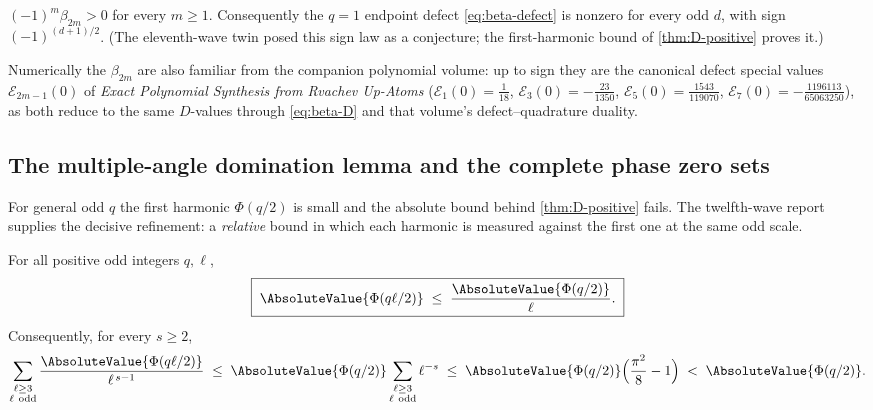 \documentclass[11pt,oneside]{article}
\numberwithin{equation}{section}
\theoremstyle{definition}
\theoremstyle{remark}
\begin{document}
\begin{corollary}
\label{cor:beta-sign}
$(-1)^{m}\beta_{2m}>0$ for every $m\ge1$.  Consequently the
$q=1$ endpoint defect \eqref{eq:beta-defect} is nonzero for every odd
$d$, with sign $(-1)^{(d+1)/2}$.  (The eleventh-wave twin posed this
sign law as a conjecture; the first-harmonic bound of
\cref{thm:D-positive} proves it.)
\end{corollary}

Numerically the $\beta_{2m}$ are also familiar from the companion
polynomial volume: up to sign they are the canonical defect special
values $\mathcal E_{2m-1}(0)$ of \emph{Exact Polynomial Synthesis
from Rvachev Up-Atoms}
($\mathcal E_1(0)=\tfrac1{18}$, $\mathcal E_3(0)=-\tfrac{23}{1350}$,
$\mathcal E_5(0)=\tfrac{1543}{119070}$,
$\mathcal E_7(0)=-\tfrac{1196113}{65063250}$), as both reduce to the
same $D$-values through \eqref{eq:beta-D} and that volume's
defect--quadrature duality.

\subsection{The multiple-angle domination lemma and the complete
phase zero sets}

For general odd $q$ the first harmonic $\Phi(q/2)$ is small and the
absolute bound behind \cref{thm:D-positive} fails.  The twelfth-wave
report supplies the decisive refinement: a \emph{relative} bound in
which each harmonic is measured against the first one at the same odd
scale.

\begin{lemma}
\label{lem:multiple-angle}
For all positive odd integers $q,\ell$,
\begin{equation}
 \boxed{\;
 \AbsoluteValue{\Phi(q\ell/2)}\;\le\;\frac{\AbsoluteValue{\Phi(q/2)}}{\ell}.\;}
 \label{eq:multiple-angle}
\end{equation}
Consequently, for every $s\ge2$,
\begin{equation}
 \sum_{\substack{\ell\ge3\\ \ell\ \mathrm{odd}}}
 \frac{\AbsoluteValue{\Phi(q\ell/2)}}{\ell^{\,s-1}}
 \;\le\;\AbsoluteValue{\Phi(q/2)}
 \sum_{\substack{\ell\ge3\\ \ell\ \mathrm{odd}}}\ell^{-s}
 \;\le\;\AbsoluteValue{\Phi(q/2)}\Bigl(\frac{\pi^{2}}8-1\Bigr)
 \;<\;\AbsoluteValue{\Phi(q/2)}.
 \label{eq:relative-dominance}
\end{equation}
\end{lemma}
\end{document}

